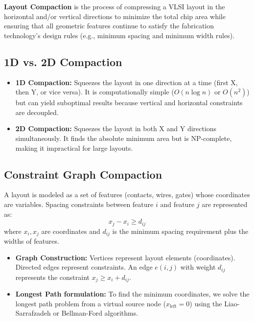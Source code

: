 \documentclass[12pt,a4paper]{article}
\begin{document}
\begin{tcolorbox}[defbox, title={Layout Compaction}]
  \textbf{Layout Compaction} is the process of compressing a VLSI layout in the horizontal and/or vertical directions to minimize the total chip area while ensuring that all geometric features continue to satisfy the fabrication technology's design rules (e.g., minimum spacing and minimum width rules).
\end{tcolorbox}

\subsection{1D vs. 2D Compaction}
\begin{itemize}[leftmargin=*, itemsep=2pt]
  \item \textbf{1D Compaction:} Squeezes the layout in one direction at a time (first X, then Y, or vice versa). It is computationally simple ($O(n \log n)$ or $O(n^2)$) but can yield suboptimal results because vertical and horizontal constraints are decoupled.
  \item \textbf{2D Compaction:} Squeezes the layout in both X and Y directions simultaneously. It finds the absolute minimum area but is NP-complete, making it impractical for large layouts.
\end{itemize}

\subsection{Constraint Graph Compaction}
A layout is modeled as a set of features (contacts, wires, gates) whose coordinates are variables. Spacing constraints between feature $i$ and feature $j$ are represented as:
\begin{equation}
  x_j - x_i \ge d_{ij}
\end{equation}
where $x_i, x_j$ are coordinates and $d_{ij}$ is the minimum spacing requirement plus the widths of features.
\begin{itemize}[leftmargin=*, itemsep=2pt]
  \item \textbf{Graph Construction:} Vertices represent layout elements (coordinates). Directed edges represent constraints. An edge $e(i, j)$ with weight $d_{ij}$ represents the constraint $x_j \ge x_i + d_{ij}$.
  \item \textbf{Longest Path formulation:} To find the minimum coordinates, we solve the longest path problem from a virtual source node ($x_{\text{left}} = 0$) using the Liao-Sarrafzadeh or Bellman-Ford algorithms.
\end{itemize}
\end{document}
